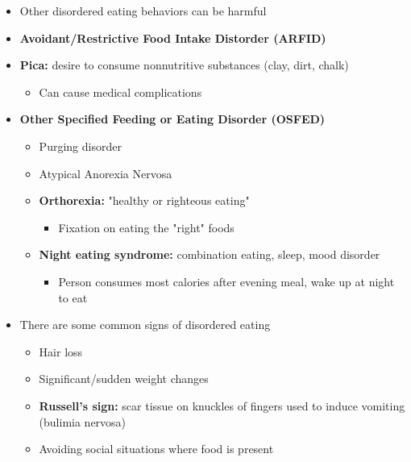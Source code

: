 \documentclass[12pt]{article}
\begin{document}
\begin{itemize}
\begin{itemize}
                    \end{itemize}
                \item Other disordered eating behaviors can be harmful
                \item \textbf{Avoidant/Restrictive Food Intake Distorder (ARFID)}
                \item \textbf{Pica:} desire to consume nonnutritive substances (clay, dirt, chalk)
                    \begin{itemize}
                        \item Can cause medical complications
                    \end{itemize}
                \item \textbf{Other Specified Feeding or Eating Disorder (OSFED)}
                    \begin{itemize}
                        \item Purging disorder
                        \item Atypical Anorexia Nervosa
                        \item \textbf{Orthorexia:} "healthy or righteous eating"
                            \begin{itemize}
                                \item Fixation on eating the "right" foods
                            \end{itemize}
                        \item \textbf{Night eating syndrome:} combination eating, sleep, mood disorder
                            \begin{itemize}
                                \item Person consumes most calories after evening meal, wake up at night to eat
                            \end{itemize}
                    \end{itemize}
                \item There are some common signs of disordered eating
                    \begin{itemize}
                        \item Hair loss
                        \item Significant/sudden weight changes
                        \item \textbf{Russell's sign:} scar tissue on knuckles of fingers used to induce vomiting (bulimia nervosa)
                        \item Avoiding social situations where food is present

\end{itemize}
\end{itemize}
\end{document}
